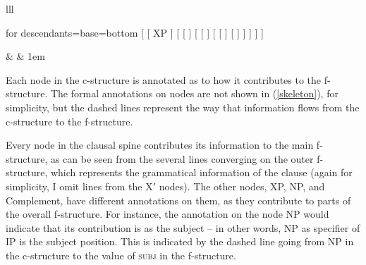 \documentclass[output=paper,hidelinks]{langscibook}
\begin{document}
\ea\label{skeleton}
\begin{tabular}[t]{lll}
\begin{forest}
  for descendants={base=bottom}
  [ 
    [ XP ]
    [  [  ] 
      [ 
        [  ]
        [ 
          [  ]
          [ \hspace*{-12mm}
          ]  
        ]
      ]
    ]
  ]
\end{forest}
& \phantom{more space} &
\lower1em\hbox{}
\end{tabular}
\z

Each node in the c-structure is annotated as to how it contributes to
the f-structure. The formal annotations on nodes are not shown in
(\ref{skeleton}), for simplicity, but the dashed lines represent the way that
information flows from the c-structure to the f-structure.

Every node in the clausal spine contributes its information to the
main f-structure, as can be seen from the several lines converging on
the outer f-struc\-ture, which represents the grammatical information of
the clause (again for simplicity, I omit lines from the X$'$ nodes).
The other nodes, XP, NP, and Complement, have different annotations on
them, as they contribute to parts of the overall f-structure. For
instance, the annotation on the node NP would indicate that its
contribution is as the subject -- in other words, NP as specifier of
IP is the subject position. This is indicated by the dashed line going
from NP in the c-structure to the value of \textsc{subj} in the
f-structure.
\end{document}
